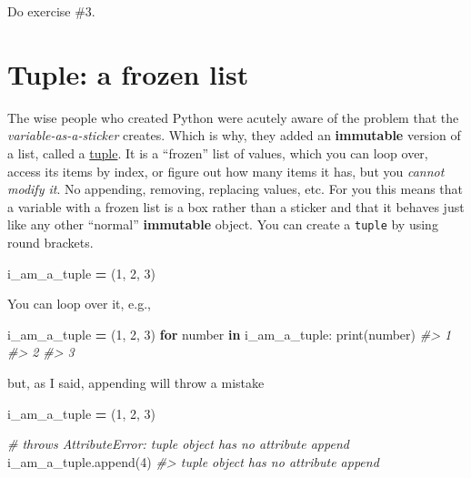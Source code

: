 \documentclass[
]{book}
\newenvironment{Shaded}{\begin{snugshade}}{\end{snugshade}}
\newcommand{\BuiltInTok}[1]{#1}
\newcommand{\CommentTok}[1]{\textcolor[rgb]{0.56,0.35,0.01}{\textit{#1}}}
\newcommand{\ControlFlowTok}[1]{\textcolor[rgb]{0.13,0.29,0.53}{\textbf{#1}}}
\newcommand{\DecValTok}[1]{\textcolor[rgb]{0.00,0.00,0.81}{#1}}
\newcommand{\KeywordTok}[1]{\textcolor[rgb]{0.13,0.29,0.53}{\textbf{#1}}}
\newcommand{\NormalTok}[1]{#1}
\newcommand{\OperatorTok}[1]{\textcolor[rgb]{0.81,0.36,0.00}{\textbf{#1}}}
\begin{document}
Do exercise \#3.

\hypertarget{tuple}{%
\section{Tuple: a frozen list}\label{tuple}}

The wise people who created Python were acutely aware of the problem that the \emph{variable-as-a-sticker} creates. Which is why, they added an \textbf{immutable} version of a list, called a \href{https://docs.python.org/3/library/stdtypes.html?highlight=tuple\#tuple}{tuple}. It is a ``frozen'' list of values, which you can loop over, access its items by index, or figure out how many items it has, but you \emph{cannot modify it}. No appending, removing, replacing values, etc. For you this means that a variable with a frozen list is a box rather than a sticker and that it behaves just like any other ``normal'' \textbf{immutable} object. You can create a \texttt{tuple} by using round brackets.

\begin{Shaded}
\begin{Highlighting}[]
\NormalTok{i\_am\_a\_tuple }\OperatorTok{=}\NormalTok{ (}\DecValTok{1}\NormalTok{, }\DecValTok{2}\NormalTok{, }\DecValTok{3}\NormalTok{)}
\end{Highlighting}
\end{Shaded}

You can loop over it, e.g.,

\begin{Shaded}
\begin{Highlighting}[]
\NormalTok{i\_am\_a\_tuple }\OperatorTok{=}\NormalTok{ (}\DecValTok{1}\NormalTok{, }\DecValTok{2}\NormalTok{, }\DecValTok{3}\NormalTok{)}
\ControlFlowTok{for}\NormalTok{ number }\KeywordTok{in}\NormalTok{ i\_am\_a\_tuple:}
    \BuiltInTok{print}\NormalTok{(number)}
\CommentTok{\#\textgreater{} 1}
\CommentTok{\#\textgreater{} 2}
\CommentTok{\#\textgreater{} 3}
\end{Highlighting}
\end{Shaded}

but, as I said, appending will throw a mistake

\begin{Shaded}
\begin{Highlighting}[]
\NormalTok{i\_am\_a\_tuple }\OperatorTok{=}\NormalTok{ (}\DecValTok{1}\NormalTok{, }\DecValTok{2}\NormalTok{, }\DecValTok{3}\NormalTok{)}

\CommentTok{\# throws AttributeError: \textquotesingle{}tuple\textquotesingle{} object has no attribute \textquotesingle{}append\textquotesingle{}}
\NormalTok{i\_am\_a\_tuple.append(}\DecValTok{4}\NormalTok{)}
\CommentTok{\#\textgreater{} \textquotesingle{}tuple\textquotesingle{} object has no attribute \textquotesingle{}append\textquotesingle{}}
\end{Highlighting}
\end{Shaded}
\end{document}
